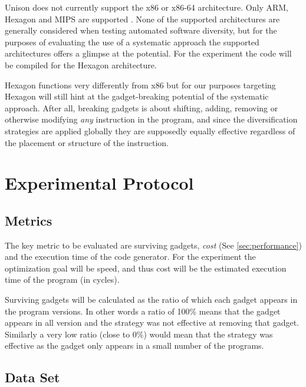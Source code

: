 Unison does not currently support the x86 or x86-64 architecture. Only ARM, Hexagon and MIPS
are supported \cite{unison-src}. None of the supported architectures are generally considered
when testing automated software diversity, but for the purposes of evaluating the use of
a systematic approach the supported architectures offers a glimpse at the potential. For
the experiment the code will be compiled for the Hexagon architecture.

Hexagon functions very differently from x86 but for our purposes targeting Hexagon will
still hint at the gadget-breaking potential of the systematic approach. After all,
breaking gadgets is about shifting, adding, removing or otherwise modifying \textit{any}
instruction in the program, and since the diversification strategies are applied globally
they are supposedly equally effective regardless of the placement or structure of the
instruction.

\section{Experimental Protocol}


\subsection{Metrics}

The key metric to be evaluated are surviving gadgets, \textit{cost} (See
\ref{sec:performance}) and the execution time of the code generator. For the experiment
the optimization goal will be speed, and thus cost will be the estimated execution time of
the program (in cycles).

Surviving gadgets will be calculated as the ratio of which each gadget appears in the program
versions. In other words a ratio of 100\% means that the gadget appears in all version
and the strategy was not effective at removing that gadget. Similarly a very low ratio
(close to 0\%) would mean that the strategy was effective as the gadget only appears in
a small number of the programs.

\subsection{Data Set}

